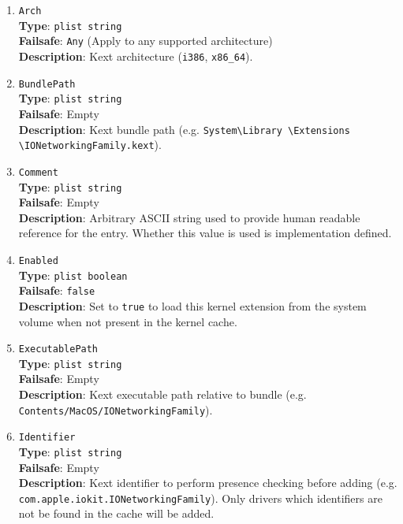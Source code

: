 \documentclass[]{article}
\begin{document}
\begin{enumerate}
\item
  \texttt{Arch}\\
  \textbf{Type}: \texttt{plist\ string}\\
  \textbf{Failsafe}: \texttt{Any} (Apply to any supported architecture)\\
  \textbf{Description}: Kext architecture (\texttt{i386}, \texttt{x86\_64}).

\item
  \texttt{BundlePath}\\
  \textbf{Type}: \texttt{plist\ string}\\
  \textbf{Failsafe}: Empty\\
  \textbf{Description}: Kext bundle path (e.g.
  \texttt{System\textbackslash Library \textbackslash Extensions \textbackslash IONetworkingFamily.kext}).

\item
  \texttt{Comment}\\
  \textbf{Type}: \texttt{plist\ string}\\
  \textbf{Failsafe}: Empty\\
  \textbf{Description}: Arbitrary ASCII string used to provide human readable
  reference for the entry. Whether this value is used is implementation defined.

\item
  \texttt{Enabled}\\
  \textbf{Type}: \texttt{plist\ boolean}\\
  \textbf{Failsafe}: \texttt{false}\\
  \textbf{Description}: Set to \texttt{true} to load this kernel extension from the
  system volume when not present in the kernel cache.

\item
  \texttt{ExecutablePath}\\
  \textbf{Type}: \texttt{plist\ string}\\
  \textbf{Failsafe}: Empty\\
  \textbf{Description}: Kext executable path relative to bundle
  (e.g. \texttt{Contents/MacOS/IONetworkingFamily}).

\item
  \texttt{Identifier}\\
  \textbf{Type}: \texttt{plist\ string}\\
  \textbf{Failsafe}: Empty\\
  \textbf{Description}: Kext identifier to perform presence checking
  before adding (e.g. \texttt{com.apple.iokit.IONetworkingFamily}).
  Only drivers which identifiers are not be found in the cache will be added.


\end{enumerate}
\end{document}
